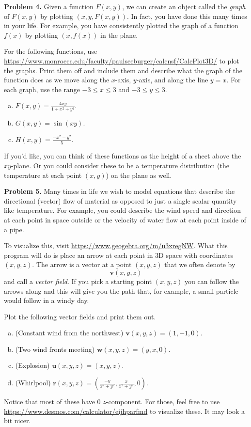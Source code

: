 \documentclass[12pt]{report} %
\theoremstyle{definition}
\begin{document}
\noindent\textbf{Problem 4.} Given a function $F(x,y)$, we can create an object called the \emph{graph} of $F(x,y)$ by plotting $(x,y,F(x,y))$.  In fact, you have done this many times in your life.  For example, you have consistently plotted the graph of a function $f(x)$ by plotting $(x,f(x))$ in the plane.  

For the following functions, use \url{https://www.monroecc.edu/faculty/paulseeburger/calcnsf/CalcPlot3D/} to plot the graphs.  Print them off and include them and describe what the graph of the function does as we move along the $x$-axis, $y$-axis, and along the line $y=x$. For each graph, use the range $-3\leq x \leq 3$ and $-3\leq y \leq 3$.
\begin{enumerate}[(a)]
    \item $F(x,y)=\frac{4xy}{1+x^2+y^2}$.
    \item $G(x,y)=\sin(xy)$.
    \item $H(x,y)=\frac{-x^2-y^2}{5}$.
\end{enumerate}
If you'd like, you can think of these functions as the height of a sheet above the $xy$-plane.  Or you could consider these to be a temperature distribution (the temperature at each point $(x,y)$) on the plane as well.
\vspace*{.5cm}

\noindent\textbf{Problem 5.} Many times in life we wish to model equations that describe the directional (vector) flow of material as opposed to just a single scalar quantity like temperature.  For example, you could describe the wind speed and direction at each point in space outside or the velocity of water flow at each point inside of a pipe. 

To visualize this, visit \url{https://www.geogebra.org/m/u3xregNW}.  What this program will do is place an arrow at each point in 3D space with coordinates $(x,y,z)$.  The arrow is a vector at a point $(x,y,z)$ that we often denote by
\[
\mathbf{v}(x,y,z)
\]
and call a \emph{vector field}. If you pick a starting point $(x,y,z)$ you can follow the arrows along and this will give you the path that, for example, a small particle would follow in a windy day.

Plot the following vector fields and print them out.
\begin{enumerate}[(a)]
    \item (Constant wind from the northwest) $\mathbf{v}(x,y,z)=(1,-1,0)$.
    \item (Two wind fronts meeting) $\mathbf{w}(x,y,z)=(y,x,0)$.
    \item (Explosion) $\mathbf{u}(x,y,z)=(x,y,z)$.
    \item (Whirlpool) $\mathbf{r}(x,y,z)=\left(\frac{-y}{x^2+y^2},\frac{x}{x^2+y^2},0\right).$
\end{enumerate}
Notice that most of these have 0 $z$-component.  For those, feel free to use \url{https://www.desmos.com/calculator/eijhparfmd} to visualize these.  It may look a bit nicer.
\end{document}
